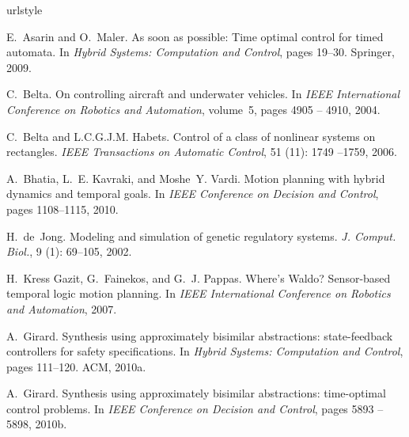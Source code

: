 \documentclass{ifacconf}
\begin{document}
\begin{thebibliography}{21}
\providecommand{\natexlab}[1]{#1}
\providecommand{\url}[1]{\texttt{#1}}
\expandafter\ifx\csname urlstyle\endcsname\relax
  \providecommand{\doi}[1]{doi: #1}\else
  \providecommand{\doi}{doi: \begingroup \urlstyle{rm}\Url}\fi

E.~Asarin and O.~Maler.
\newblock As soon as possible: Time optimal control for timed automata.
\newblock In \emph{Hybrid Systems: Computation and Control}, pages 19--30.
  Springer, 2009.

C.~Belta.
\newblock On controlling aircraft and underwater vehicles.
\newblock In \emph{{IEEE} International Conference on Robotics and Automation},
  volume~5, pages 4905 -- 4910, 2004.

C.~Belta and L.C.G.J.M. Habets.
\newblock Control of a class of nonlinear systems on rectangles.
\newblock \emph{IEEE Transactions on Automatic Control}, 51
  (11): 1749 --1759, 2006.

A.~Bhatia, L.~E. Kavraki, and Moshe~Y. Vardi.
\newblock Motion planning with hybrid dynamics and temporal goals.
\newblock In \emph{{IEEE} Conference on Decision and Control}, pages
  1108--1115, 2010.

H.~de~Jong.
\newblock Modeling and simulation of genetic regulatory systems.
\newblock \emph{J. Comput. Biol.}, 9 (1): 69--105, 2002.

H.~Kress Gazit, G.~Fainekos, and G.~J. Pappas.
\newblock Where's {W}aldo? {S}ensor-based temporal logic motion planning.
\newblock In \emph{{IEEE} International Conference on Robotics and Automation},
  2007.

\bibitem[Girard(2010{\natexlab{a}})]{Girard:2010}
A.~Girard.
\newblock Synthesis using approximately bisimilar abstractions: state-feedback
  controllers for safety specifications.
\newblock In \emph{Hybrid Systems: Computation and Control}, pages 111--120.
  ACM, 2010{\natexlab{a}}.

\bibitem[Girard(2010{\natexlab{b}})]{Girard:2010Opt}
A.~Girard.
\newblock Synthesis using approximately bisimilar abstractions: time-optimal
  control problems.
\newblock In \emph{{IEEE} Conference on Decision and Control}, pages 5893
  --5898, 2010{\natexlab{b}}.


\end{thebibliography}
\end{document}
